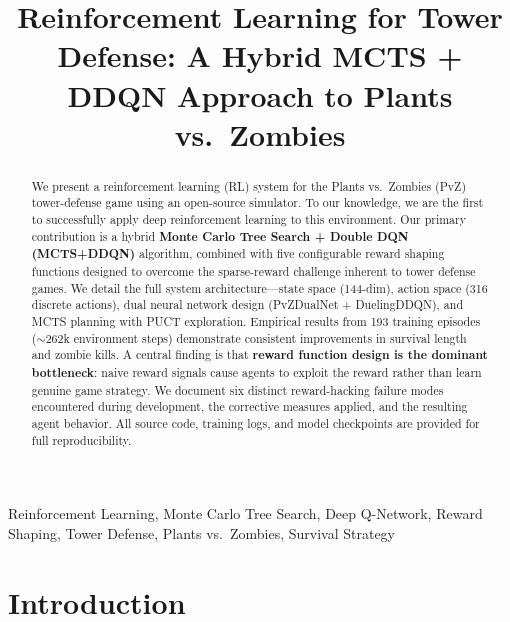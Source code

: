 \documentclass[conference]{IEEEtran}
\begin{document}
\title{Reinforcement Learning for Tower Defense: A Hybrid MCTS + DDQN Approach to Plants vs.\ Zombies}

\author{
}

\maketitle

\begin{abstract}
We present a reinforcement learning (RL) system for the Plants vs.\ Zombies (PvZ) tower-defense game using an open-source simulator. To our knowledge, we are the first to successfully apply deep reinforcement learning to this environment. Our primary contribution is a hybrid \textbf{Monte Carlo Tree Search + Double DQN (MCTS+DDQN)} algorithm, combined with five configurable reward shaping functions designed to overcome the sparse-reward challenge inherent to tower defense games. We detail the full system architecture---state space (144-dim), action space (316 discrete actions), dual neural network design (PvZDualNet + DuelingDDQN), and MCTS planning with PUCT exploration. Empirical results from 193 training episodes ($\sim$262k environment steps) demonstrate consistent improvements in survival length and zombie kills. A central finding is that \textbf{reward function design is the dominant bottleneck}: naive reward signals cause agents to exploit the reward rather than learn genuine game strategy. We document six distinct reward-hacking failure modes encountered during development, the corrective measures applied, and the resulting agent behavior. All source code, training logs, and model checkpoints are provided for full reproducibility.
\end{abstract}

\begin{IEEEkeywords}
Reinforcement Learning, Monte Carlo Tree Search, Deep Q-Network, Reward Shaping, Tower Defense, Plants vs.\ Zombies, Survival Strategy
\end{IEEEkeywords}

\section{Introduction}
\end{document}
